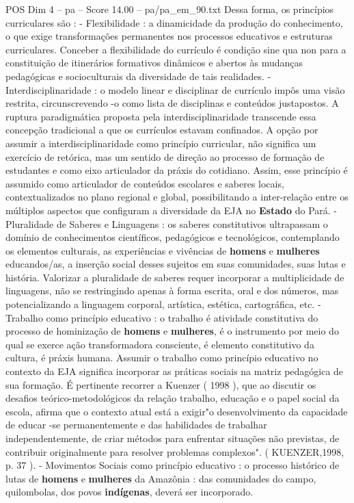 \begin{textsample}{POS Dim 4 – pa – Score 14.00 – pa/pa\_em\_90.txt}
Dessa forma, os princípios curriculares são : - Flexibilidade : a dinamicidade da produção do conhecimento, o que exige transformações permanentes nos processos educativos e estruturas curriculares.
Conceber a flexibilidade do currículo é condição sine qua non para a constituição de itinerários formativos dinâmicos e abertos às mudanças pedagógicas e socioculturais da diversidade de tais realidades. - Interdisciplinaridade : o modelo linear e disciplinar de currículo impôs uma visão restrita, circunscrevendo -o como lista de disciplinas e conteúdos justapostos.
A ruptura paradigmática proposta pela interdisciplinaridade transcende essa concepção tradicional a que os currículos estavam confinados.
A opção por assumir a interdisciplinaridade como princípio curricular, não significa um exercício de retórica, mas um sentido de direção ao processo de formação de estudantes e como eixo articulador da práxis do cotidiano.
Assim, esse princípio é assumido como articulador de conteúdos escolares e saberes locais, contextualizados no plano regional e global, possibilitando a inter-relação entre os múltiplos aspectos que configuram a diversidade da EJA no \textbf{Estado} do Pará. - Pluralidade de Saberes e Linguagens : os saberes constitutivos ultrapassam o domínio de conhecimentos científicos, pedagógicos e tecnológicos, contemplando os elementos culturais, as experiências e vivências de \textbf{homens} e \textbf{mulheres} educandos/as, a inserção social desses sujeitos em suas comunidades, suas lutas e história.
Valorizar a pluralidade de saberes requer incorporar a multiplicidade de linguagens, não se restringindo apenas à forma escrita, oral e dos números, mas potencializando a linguagem corporal, artística, estética, cartográfica, etc. - Trabalho como princípio educativo : o trabalho é atividade constitutiva do processo de hominização de \textbf{homens} e \textbf{mulheres}, é o instrumento por meio do qual se exerce ação transformadora consciente, é elemento constitutivo da cultura, é práxis humana.
Assumir o trabalho como princípio educativo no contexto da EJA significa incorporar as práticas sociais na matriz pedagógica de sua formação.
É pertinente recorrer a Kuenzer ( 1998 ), que ao discutir os desafios teórico-metodológicos da relação trabalho, educação e o papel social da escola, afirma que o contexto atual está a exigir"o desenvolvimento da capacidade de educar -se permanentemente e das habilidades de trabalhar independentemente, de criar métodos para enfrentar situações não previstas, de contribuir originalmente para resolver problemas complexos". ( KUENZER,1998, p. 37 ). - Movimentos Sociais como princípio educativo : o processo histórico de lutas de \textbf{homens} e \textbf{mulheres} da Amazônia : das comunidades do campo, quilombolas, dos povos \textbf{indígenas}, deverá ser incorporado.

\end{textsample}
